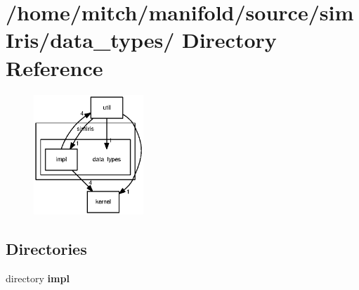 \section{/home/mitch/manifold/source/simIris/data\_\-types/ Directory Reference}
\label{dir_c7dbbd5741a2465101b9d47b74e145cd}


\nopagebreak
\begin{figure}[H]
\begin{center}
\leavevmode
\includegraphics[width=117pt]{dir_c7dbbd5741a2465101b9d47b74e145cd_dep}
\end{center}
\end{figure}
\subsection*{Directories}
\begin{CompactItemize}
\item 
directory {\bf impl}
\end{CompactItemize}
